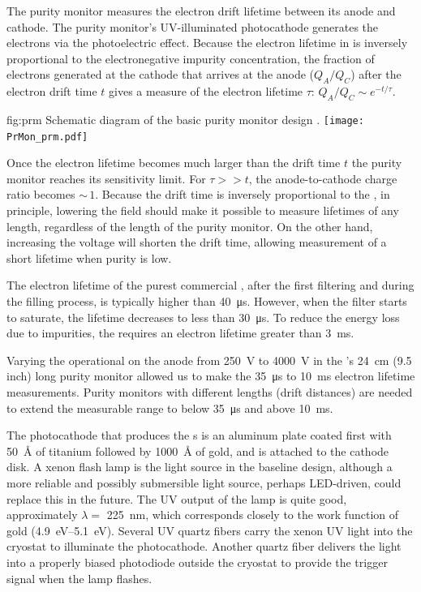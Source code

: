 The purity monitor measures the electron drift lifetime between its anode and cathode. The purity monitor's UV-illuminated %
photocathode generates the electrons via the photoelectric effect. Because the electron lifetime in  is inversely proportional to the electronegative impurity concentration, the fraction of electrons generated at the cathode that arrives at the anode ($Q_A/Q_C$) after the electron drift time $t$ gives a measure of the electron lifetime $\tau$:
%
\( Q_A/Q_C \sim e^{-t/\tau}.\)



\begin{dunefigure}{fig:prm}
  {Schematic diagram of the basic purity monitor design \cite{Adamowski:2014daa}.}
  \texttt{[image: PrMon\_prm.pdf]}
\end{dunefigure}


Once the electron lifetime becomes much larger than the drift time $t$ the purity monitor reaches its sensitivity limit.  For $\tau >> t$, the anode-to-cathode charge ratio becomes $\sim\,1$. Because the drift time is inversely proportional to the \efield, in principle, lowering the %
field should make it possible to measure lifetimes of any length, regardless of the length of the purity monitor.
On the other hand, increasing the voltage will shorten the drift time, allowing measurement of a short lifetime when purity is low. 

The electron lifetime of the purest commercial , after the first filtering and during the filling process, is typically higher than \SI{40}{\micro\second}. However, when the filter starts to saturate, the lifetime decreases to less than \SI{30}{\micro\second}.  To %
reduce the energy loss due to impurities,  the  requires an electron lifetime greater than \SI{3}{\milli\second}.

Varying the operational  on the anode from \SI{250}{V} to \SI{4000}{V} in the 's \SI{24}{cm} (9.5 inch) long purity monitor allowed us to make the \SI{35}{\micro\second} to \SI{10}{\milli\second} electron lifetime measurements. 
Purity monitors with different lengths (drift distances) are needed to extend the measurable range to below \SI{35}{\micro\second} and above  \SI{10}{\milli\second}.

The photocathode that produces the \phel{}s is an aluminum plate coated first with \SI{50}{\angstrom} of titanium followed by \SI{1000}{\angstrom} of gold, and is attached to the cathode disk.
A xenon flash lamp is the light source in the baseline design, although %
a more reliable and possibly submersible light source, perhaps LED-driven, could replace this in the future. The UV output of the lamp is quite good, approximately $\lambda=$ \SI{225}{\nano\meter}, which corresponds closely to the work function of gold (\SIrange{4.9}{5.1}{\eV}). 
Several UV quartz fibers carry the xenon UV light into the cryostat to illuminate the %
photocathode.   Another quartz fiber delivers the light into a properly biased photodiode outside the cryostat to provide the trigger signal when the lamp flashes. 



